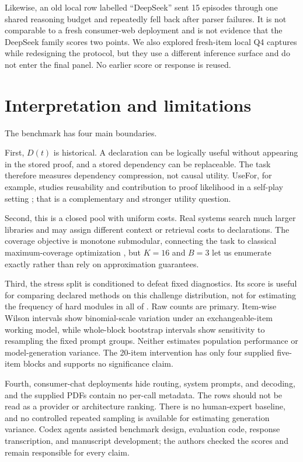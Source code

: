 Likewise, an old local row labelled ``DeepSeek'' sent 15 episodes through one
shared reasoning budget and repeatedly fell back after parser failures.  It is
not comparable to a fresh consumer-web deployment and is not evidence that the
DeepSeek family scores two points.  We also explored fresh-item local Q4
captures while redesigning the protocol, but they use a different inference
surface and do not enter the final panel.  No earlier score or response is
reused.

\section{Interpretation and limitations}

The benchmark has four main boundaries.

First, $D(t)$ is historical.  A declaration can be logically useful without
appearing in the stored proof, and a stored dependency can be replaceable.
The task therefore measures dependency compression, not causal utility.
UseFor, for example, studies reusability and contribution to proof likelihood
in a self-play setting \citep{kasriel2025usefor}; that is a complementary and
stronger utility question.

Second, this is a closed pool with uniform costs.  Real systems search much
larger libraries and may assign different context or retrieval costs to
declarations.  The coverage objective is monotone submodular, connecting the
task to classical maximum-coverage optimization
\citep{nemhauser1978submodular}, but $K=16$ and $B=3$ let us enumerate exactly
rather than rely on approximation guarantees.

Third, the stress split is conditioned to defeat fixed diagnostics.  Its score
is useful for comparing declared methods on this challenge distribution, not
for estimating the frequency of hard modules in all of \mathlib{}.  Raw counts
are primary.  Item-wise Wilson intervals show binomial-scale variation under an
exchangeable-item working model, while whole-block bootstrap intervals show
sensitivity to resampling the fixed prompt groups.  Neither estimates population
performance or model-generation variance.  The 20-item intervention has only
four supplied five-item blocks and supports no significance claim.

Fourth, consumer-chat deployments hide routing, system prompts, and decoding,
and the supplied PDFs contain no per-call metadata.  The rows should not be
read as a provider or architecture ranking.  There is no human-expert baseline,
and no controlled repeated sampling is available for estimating generation variance.  Codex
agents assisted benchmark design, evaluation code, response transcription, and
manuscript development; the authors checked the scores and remain responsible
for every claim.

